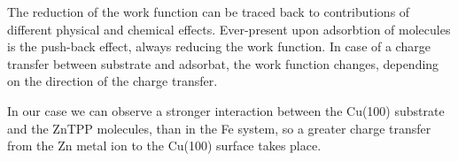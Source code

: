 The reduction of the work function can be traced back to contributions of different physical and chemical effects.
Ever-present upon adsorbtion of molecules is the push-back effect, always reducing the work function.
In case of a charge transfer between substrate and adsorbat, the work function changes, depending on the direction of the charge transfer. 

In our case we can observe a stronger interaction between the Cu(100) substrate and the ZnTPP molecules, than in the Fe system, so a greater charge transfer from the Zn metal ion to the Cu(100) surface takes place.
\FloatBarrier

